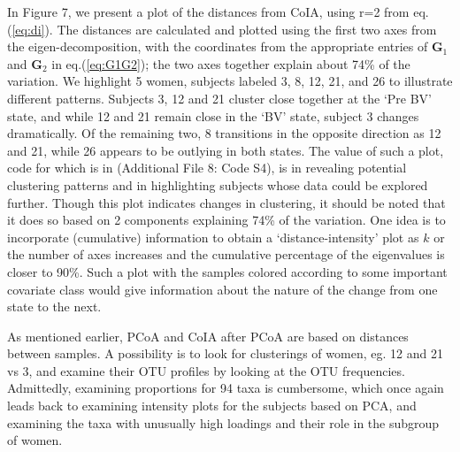\documentclass[doublespacing]{bmcart}
\def\texttt{[image: ]}
\def\G{\mathbf{G}}
\begin{document}
In Figure 7, we present a plot of the distances from CoIA, using r=2 from eq. (\ref{eq:di}). The distances are calculated and plotted using the first two axes from the eigen-decomposition, with the coordinates from the appropriate entries of $\G_1$ and $\G_2$ in eq.(\ref{eq:G1G2}); the two axes together explain about 74\% of the variation. We highlight 5 women, subjects labeled 3, 8, 12, 21, and 26 to illustrate different patterns. Subjects 3, 12 and 21 cluster close together at the `Pre BV' state, and while 12 and 21 remain close in the `BV' state, subject 3 changes dramatically. Of the remaining two, 8 transitions in the opposite direction as 12 and 21, while 26 appears to be outlying in both states. The value of such a plot, code for which is in  (Additional File 8: Code S4), is in revealing potential clustering patterns and in highlighting subjects whose data could be explored further. Though this plot indicates changes in clustering, it should be noted that it does so based on 2 components explaining 74\% of the variation. 
One idea is to incorporate (cumulative) information to obtain a `distance-intensity' plot as $k$ or the number of axes increases and the cumulative percentage of the eigenvalues is closer to 90\%. Such a plot with the samples colored according to some important covariate class would give information about the nature of the change from one state to the next. 

As mentioned earlier, PCoA and CoIA after PCoA are based on distances between samples. A possibility is to look for clusterings of women, eg. 12 and 21 vs 3, and examine their OTU profiles by looking at the OTU frequencies. Admittedly, examining proportions for 94 taxa is cumbersome, which once again leads back to examining intensity plots for the subjects based on PCA, and examining the taxa with unusually high loadings and their role in the subgroup of women.  
\end{document}
